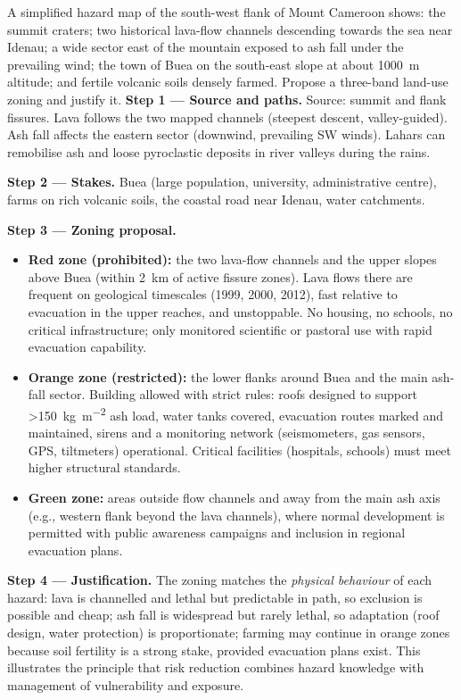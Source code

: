 \documentclass[11pt]{article}
\begin{document}
\begin{exoresolu}
A simplified hazard map of the south-west flank of Mount Cameroon shows: the summit craters; two historical lava-flow channels descending towards the sea near Idenau; a wide sector east of the mountain exposed to ash fall under the prevailing wind; the town of Buea on the south-east slope at about \SI{1000}{m} altitude; and fertile volcanic soils densely farmed. Propose a three-band land-use zoning and justify it.
\tcblower
\textbf{Step 1 — Source and paths.} Source: summit and flank fissures. Lava follows the two mapped channels (steepest descent, valley-guided). Ash fall affects the eastern sector (downwind, prevailing SW winds). Lahars can remobilise ash and loose pyroclastic deposits in river valleys during the rains.

\textbf{Step 2 — Stakes.} Buea (large population, university, administrative centre), farms on rich volcanic soils, the coastal road near Idenau, water catchments.

\textbf{Step 3 — Zoning proposal.}
\begin{itemize}
\item \textbf{Red zone (prohibited):} the two lava-flow channels and the upper slopes above Buea (within \SI{2}{km} of active fissure zones). Lava flows there are frequent on geological timescales (1999, 2000, 2012), fast relative to evacuation in the upper reaches, and unstoppable. No housing, no schools, no critical infrastructure; only monitored scientific or pastoral use with rapid evacuation capability.
\item \textbf{Orange zone (restricted):} the lower flanks around Buea and the main ash-fall sector. Building allowed with strict rules: roofs designed to support \SI{>150}{kg.m^{-2}} ash load, water tanks covered, evacuation routes marked and maintained, sirens and a monitoring network (seismometers, gas sensors, GPS, tiltmeters) operational. Critical facilities (hospitals, schools) must meet higher structural standards.
\item \textbf{Green zone:} areas outside flow channels and away from the main ash axis (e.g., western flank beyond the lava channels), where normal development is permitted with public awareness campaigns and inclusion in regional evacuation plans.
\end{itemize}

\textbf{Step 4 — Justification.} The zoning matches the \emph{physical behaviour} of each hazard: lava is channelled and lethal but predictable in path, so exclusion is possible and cheap; ash fall is widespread but rarely lethal, so adaptation (roof design, water protection) is proportionate; farming may continue in orange zones because soil fertility is a strong stake, provided evacuation plans exist. This illustrates the principle that risk reduction combines hazard knowledge with management of vulnerability and exposure.
\end{exoresolu}
\end{document}
